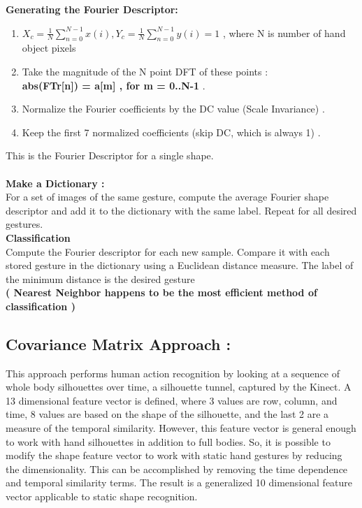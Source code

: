 \textbf{Generating the Fourier Descriptor: }\\
\begin{enumerate}
    \item $X_{c} = \frac{1}{N}\sum_{n=0}^{N-1} x(i) , Y_{c} = \frac{1}{N}\sum_{n=0}^{N-1} y(i)  = 1$ , where N is number of hand object pixels 
    \item Take the magnitude of the N point DFT of these points :\\
              \textbf{ abs(FT{r[n]}) = a[m] , for m = 0..N-1 }.
    \item Normalize the Fourier coefficients by the DC value (Scale Invariance) .
    \item Keep the first 7 normalized coefficients (skip DC, which is always 1) .

\end{enumerate}


This is the Fourier Descriptor for a single shape.\\
\\
\textbf{Make a Dictionary :}\\
For a set of images of the same gesture, compute the average Fourier shape descriptor
and add it to the dictionary with the same label. Repeat for all desired gestures.\\
\textbf{Classification}\\
Compute the Fourier descriptor for each new sample. Compare it with each stored
gesture in the dictionary using a Euclidean distance measure. The label of the minimum
distance is the desired gesture \\
\textbf{( Nearest Neighbor  happens to be the most efficient method of classification  ) }

\subsection{Covariance Matrix Approach :}
This approach \cite{21}
performs human action recognition by looking at a sequence of whole body silhouettes
over time, a silhouette tunnel, captured by the Kinect. A 13 dimensional feature vector
is defined, where 3 values are row, column, and time, 8 values are based on the shape of
the silhouette, and the last 2 are a measure of the temporal similarity.
However, this feature vector is general enough to work with hand silhouettes in addition
to full bodies. So, it is possible to modify the shape feature vector to work with static
hand gestures by reducing the dimensionality. This can be accomplished by removing
the time dependence and temporal similarity terms. The result is a generalized 10
dimensional feature vector applicable to static shape recognition.\\

